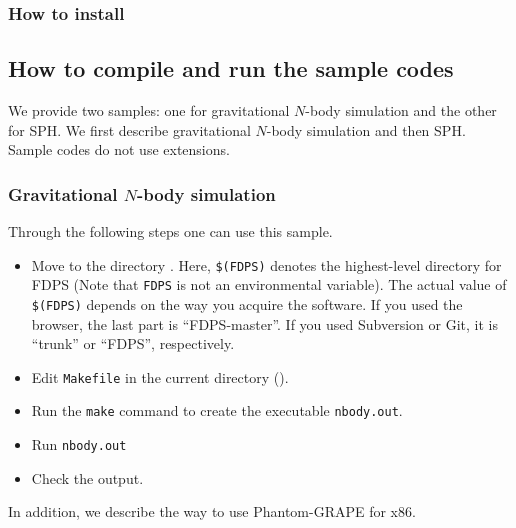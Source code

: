 \subsubsection{How to install}

\subsection{How to compile and run the sample codes}
\label{subsec:how_to_comple_and_run_sample_codes}
We provide two samples: one for gravitational $N$-body simulation and the other for SPH. We first describe gravitational $N$-body simulation and then SPH. Sample codes do not use extensions. 

\subsubsection{Gravitational $N$-body simulation}
Through the following steps one can use this sample.
\begin{itemize}
\item Move to the directory \dirNameNbodySample. Here, \texttt{\$(FDPS)} denotes the highest-level directory for FDPS (Note that \texttt{FDPS} is not an environmental variable). The actual value of \texttt{\$(FDPS)} depends on the way you acquire the software. If you used the browser, the last part is ``FDPS-master''. If you used Subversion or Git, it is ``trunk'' or ``FDPS'', respectively. 
\item Edit \texttt{Makefile} in the current directory (\dirNameNbodySample).
\item Run the \texttt{make} command to create the executable \texttt{nbody.out}.
\item Run \texttt{nbody.out}
\item Check the output.
\end{itemize}
In addition, we describe the way to use Phantom-GRAPE for x86.

